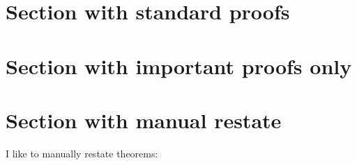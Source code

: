 \documentclass{article}
\begin{document}
\section{Section with standard proofs}
% 
\printProofs

\section{Section with important proofs only}
\printProofs[greattheorem]

\section{Section with manual restate}\label{sec:manualrestate}

I like to manually restate theorems:
\mymanualrestate*
\end{document}
